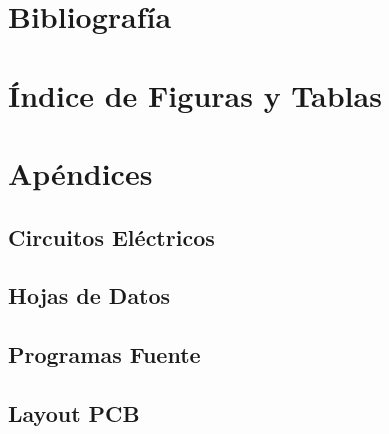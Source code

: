 \documentclass[a4paper,10pt]{article}
\begin{document}
\section{Bibliografía} \label{sec:7_biblio}

\section{Índice de Figuras y Tablas} \label{sec:7b_indice}
\listoffigures
\listoftables

\section{Apéndices} \label{sec:8_apendix}
\subsection{Circuitos Eléctricos} \label{sec:9_circ}
\subsection{Hojas de Datos} \label{sec:10_hd}
\subsection{Programas Fuente} \label{sec:11_soft}
\subsection{Layout PCB} \label{sec:12_pcblay}
\end{document}
